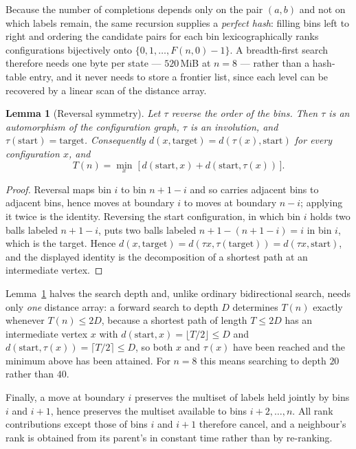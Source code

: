 \documentclass[11pt]{amsart}
\theoremstyle{plain}
\newtheorem{lemma}[theorem]{Lemma}
\theoremstyle{definition}
\theoremstyle{remark}
\begin{document}
Because the number of completions depends only on the pair $(a,b)$ and not on which labels remain, the same recursion supplies a \emph{perfect hash}: filling bins left to right and ordering the candidate pairs for each bin lexicographically ranks configurations bijectively onto $\{0,1,\dots,F(n,0)-1\}$. A breadth-first search therefore needs one byte per state --- $520$\,MiB at $n=8$ --- rather than a hash-table entry, and it never needs to store a frontier list, since each level can be recovered by a linear scan of the distance array.

\begin{lemma}[Reversal symmetry]
\label{lem:tau}
Let $\tau$ reverse the order of the bins. Then $\tau$ is an automorphism of the configuration graph, $\tau$ is an involution, and $\tau(\mathrm{start})=\mathrm{target}$. Consequently $d(x,\mathrm{target})=d(\tau(x),\mathrm{start})$ for every configuration $x$, and
\[
T(n) = \min_{x}\;\bigl[\,d(\mathrm{start},x) + d(\mathrm{start},\tau(x))\,\bigr].
\]
\end{lemma}

\begin{proof}
Reversal maps bin $i$ to bin $n+1-i$ and so carries adjacent bins to adjacent bins, hence moves at boundary $i$ to moves at boundary $n-i$; applying it twice is the identity. Reversing the start configuration, in which bin $i$ holds two balls labeled $n+1-i$, puts two balls labeled $n+1-(n+1-i)=i$ in bin $i$, which is the target. Hence $d(x,\mathrm{target})=d(\tau x,\tau(\mathrm{target}))=d(\tau x,\mathrm{start})$, and the displayed identity is the decomposition of a shortest path at an intermediate vertex.
\end{proof}

Lemma~\ref{lem:tau} halves the search depth and, unlike ordinary bidirectional search, needs only \emph{one} distance array: a forward search to depth $D$ determines $T(n)$ exactly whenever $T(n)\le 2D$, because a shortest path of length $T\le 2D$ has an intermediate vertex $x$ with $d(\mathrm{start},x)=\lfloor T/2\rfloor\le D$ and $d(\mathrm{start},\tau(x))=\lceil T/2\rceil\le D$, so both $x$ and $\tau(x)$ have been reached and the minimum above has been attained. For $n=8$ this means searching to depth $20$ rather than $40$.

Finally, a move at boundary $i$ preserves the multiset of labels held jointly by bins $i$ and $i+1$, hence preserves the multiset available to bins $i+2,\dots,n$. All rank contributions except those of bins $i$ and $i+1$ therefore cancel, and a neighbour's rank is obtained from its parent's in constant time rather than by re-ranking.
\end{document}
